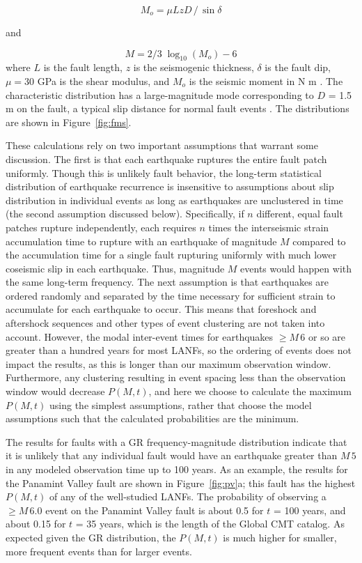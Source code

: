 \documentclass[draft,grl]{AGUTeX}
\begin{document}
\begin{article}
\begin{equation}
 M_o = \mu L z D \,/ \, \sin \delta 
 \end{equation}

and

\begin{equation}
M = 2/3 \; \log_{10} (M_o) - 6
\end{equation}
where $L$ is the fault length, $z$ is the seismogenic thickness, $\delta$ is
the fault dip, $\mu = 30$ GPa is the shear modulus, and $M_o$ is the seismic
moment in N m \citep[e.g.,][]{akirichards2002, kagan2003pepi}.  The
characteristic distribution has a large-magnitude mode corresponding to $D$
= 1.5 m on the fault, a typical slip distance for normal fault events
\citep[e.g.][]{wesnousky2008displacement}.  The distributions are shown in
Figure~\ref{fig:fms}.

These calculations rely on two important assumptions that warrant some
discussion.  The first is that each earthquake ruptures the entire fault patch
uniformly.  Though this is unlikely fault behavior, the long-term statistical
distribution of earthquake recurrence is insensitive to assumptions about slip
distribution in individual events as long as earthquakes are unclustered in
time (the second assumption discussed below).  Specifically, if $n$ different,
equal fault patches rupture independently, each requires $n$ times the
interseismic strain accumulation time to rupture with an earthquake of
magnitude $M$ compared to the accumulation time for a single fault rupturing
uniformly with much lower coseismic slip in each earthquake. Thus, magnitude
$M$ events would happen with the same long-term frequency.  The next assumption
is that earthquakes are ordered randomly and separated by the time necessary
for sufficient strain to accumulate for each earthquake to occur.  This means
that foreshock and aftershock sequences and other types of event clustering are
not taken into account.  However, the modal inter-event times for earthquakes
$\ge M \,6$ or so are greater than a hundred years for most LANFs, so the
ordering of events does not impact the results, as this is longer than our
maximum observation window.  Furthermore, any clustering resulting in event
spacing less than the observation window would decrease $P(M,t)$, and here we
choose to calculate the maximum $P(M,t)$ using the simplest assumptions, rather
that choose the model assumptions such that the calculated probabilities are
the minimum.

The results for faults with a GR frequency-magnitude distribution indicate that
it is unlikely that any individual fault would have an earthquake greater than
$M \, 5$ in any modeled observation time up to 100 years.
As an example, the results for the Panamint Valley fault are shown in
Figure~\ref{fig:pv}a; this fault has the highest $P(M,t)$ of any of the
well-studied LANFs.  The probability of observing a $\ge M \, 6.0$ event on the
Panamint Valley fault is about 0.5 for $t$ = 100 years, and about 0.15 for $t$
= 35 years, which is the length of the Global CMT catalog. As expected given
the GR distribution, the $P(M,t)$ is much higher for smaller, more frequent
events than for larger events.  


\end{article}
\end{document}
